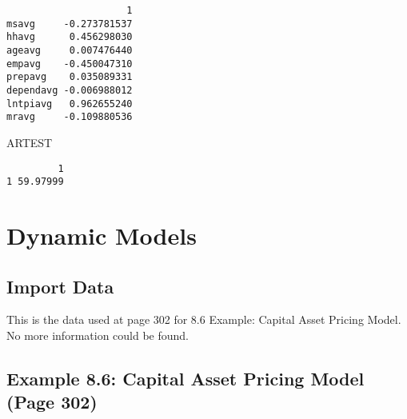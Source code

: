 \documentclass[]{book}
\newenvironment{Shaded}{\begin{snugshade}}{\end{snugshade}}
\newcommand{\CharTok}[1]{\textcolor[rgb]{0.31,0.60,0.02}{#1}}
\newcommand{\CommentTok}[1]{\textcolor[rgb]{0.56,0.35,0.01}{\textit{#1}}}
\newcommand{\DataTypeTok}[1]{\textcolor[rgb]{0.13,0.29,0.53}{#1}}
\newcommand{\DecValTok}[1]{\textcolor[rgb]{0.00,0.00,0.81}{#1}}
\newcommand{\KeywordTok}[1]{\textcolor[rgb]{0.13,0.29,0.53}{\textbf{#1}}}
\newcommand{\NormalTok}[1]{#1}
\newcommand{\OperatorTok}[1]{\textcolor[rgb]{0.81,0.36,0.00}{\textbf{#1}}}
\newcommand{\OtherTok}[1]{\textcolor[rgb]{0.56,0.35,0.01}{#1}}
\newcommand{\StringTok}[1]{\textcolor[rgb]{0.31,0.60,0.02}{#1}}
\begin{document}
\begin{verbatim}
                     1
msavg     -0.273781537
hhavg      0.456298030
ageavg     0.007476440
empavg    -0.450047310
prepavg    0.035089331
dependavg -0.006988012
lntpiavg   0.962655240
mravg     -0.109880536
\end{verbatim}

\begin{Shaded}
\begin{Highlighting}[]
\NormalTok{ARTEST}
\end{Highlighting}
\end{Shaded}

\begin{verbatim}
         1
1 59.97999
\end{verbatim}

\hypertarget{dynamic-models}{%
\chapter{Dynamic Models}\label{dynamic-models}}

\hypertarget{import-data-6}{%
\section{Import Data}\label{import-data-6}}

\begin{Shaded}
\end{Shaded}

This is the data used at page 302 for 8.6 Example: Capital Asset Pricing Model. No more information could be found.

\hypertarget{example-8.6-capital-asset-pricing-model-page-302}{%
\section{Example 8.6: Capital Asset Pricing Model (Page 302)}\label{example-8.6-capital-asset-pricing-model-page-302}}
\end{document}
